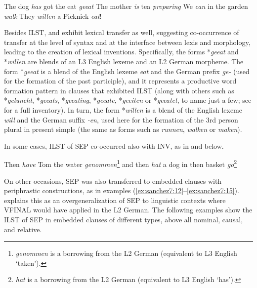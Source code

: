 \documentclass[output=paper,modfonts,nonflat, newtxmath]{langsci/langscibook}
\begin{document}
\ea%
  \label{ex:sanchez7:6}
   The dog  \textit{has} got the eat {\textit{geeat}}
\ex %
  \label{ex:sanchez7:7}
   The mother  \textit{is} tea {\textit{preparing}}
\ex%
  \label{ex:sanchez7:8}
   We  \textit{can} in the garden {\textit{walk}}
\ex%
  \label{ex:sanchez7:9}
     They  \textit{willen} a Picknick {\textit{eat}}!
\z



Besides ILST,  and  exhibit lexical transfer as well, suggesting co-occur\-rence of transfer at the level of syntax and at the interface between lexis and morphology, leading to the creation of lexical inventions. Specifically, the forms *\textit{geeat}  and *\textit{willen}  are blends of an L3 English lexeme and an L2 German morpheme. The form *\textit{geeat} is a blend of the English lexeme \textit{eat} and the German prefix \textit{ge-} (used for the formation of the past participle), and it represents a productive word formation pattern in clauses that exhibited ILST (along with others such as *\textit{geluncht}, *\textit{geeats}, *\textit{geeating}, *\textit{geeate}, *\textit{geeiten} or *\textit{geeatet}, to name just a few; see \citealt{Sánchez2015L2} for a full inventory). In turn, the form *\textit{willen} is a blend of the English lexeme \textit{will} and the German suffix \textit{-en}, used here for the formation of the 3rd person plural in present simple (the same as forms such as \textit{runnen}, \textit{walken} or \textit{maken}).

In some cases, ILST of SEP co-occurred also with INV, as in  and  below.

\ea%
  \label{ex:sanchez7:10}
  Then  \textit{have} Tom the water \textit{genommen}\footnote{\textit{genommen} is a borrowing from the L2 German (equivalent to L3 English ‘taken’).}
\ex %
  \label{ex:sanchez7:11}
 	and then  \textit{hat} a dog in then basket {\textit{go}}\footnote{\textit{hat} is a borrowing from the L2 German (equivalent to L3 English ‘has’).}
\z

On other occasions, SEP was also transferred to embedded clauses with periphrastic constructions, as in examples (\ref{ex:sanchez7:12}--\ref{ex:sanchez7:15}). \citet{Sánchez2016} explains this as an overgeneralization of SEP to linguistic contexts where VFINAL would have applied in the L2 German. The following examples show the ILST of SEP in embedded clauses of different types, above all nominal, causal, and relative.
\end{document}
